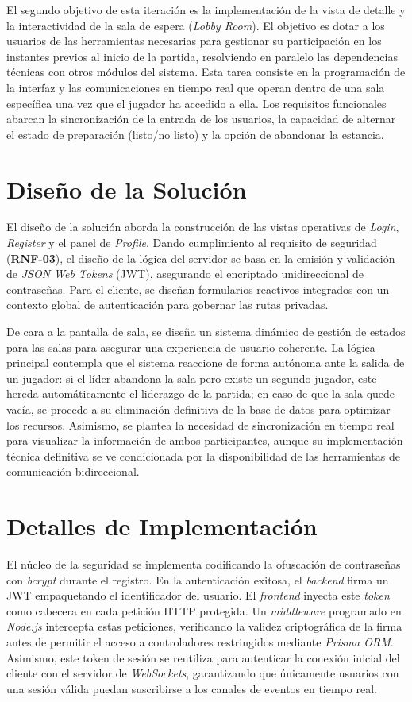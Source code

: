 El segundo objetivo de esta iteración es la implementación de la vista de detalle y la interactividad de la sala de espera (\textit{Lobby Room}). El objetivo es dotar a los usuarios de las herramientas necesarias para gestionar su participación en los instantes previos al inicio de la partida, resolviendo en paralelo las dependencias técnicas con otros módulos del sistema. Esta tarea consiste en la programación de la interfaz y las comunicaciones en tiempo real que operan dentro de una sala específica una vez que el jugador ha accedido a ella. Los requisitos funcionales abarcan la sincronización de la entrada de los usuarios, la capacidad de alternar el estado de preparación (listo/no listo) y la opción de abandonar la estancia.

\section{Diseño de la Solución}
El diseño de la solución aborda la construcción de las vistas operativas de \textit{Login}, \textit{Register} y el panel de \textit{Profile}. Dando cumplimiento al requisito de seguridad (\textbf{RNF-03}), el diseño de la lógica del servidor se basa en la emisión y validación de \textit{JSON Web Tokens} (JWT), asegurando el encriptado unidireccional de contraseñas. Para el cliente, se diseñan formularios reactivos integrados con un contexto global de autenticación para gobernar las rutas privadas.

De cara a la pantalla de sala, se diseña un sistema dinámico de gestión de estados para las salas para asegurar una experiencia de usuario coherente. La lógica principal contempla que el sistema reaccione de forma autónoma ante la salida de un jugador: si el líder abandona la sala pero existe un segundo jugador, este hereda automáticamente el liderazgo de la partida; en caso de que la sala quede vacía, se procede a su eliminación definitiva de la base de datos para optimizar los recursos. Asimismo, se plantea la necesidad de sincronización en tiempo real para visualizar la información de ambos participantes, aunque su implementación técnica definitiva se ve condicionada por la disponibilidad de las herramientas de comunicación bidireccional.

\section{Detalles de Implementación}
El núcleo de la seguridad se implementa codificando la ofuscación de contraseñas con \textit{bcrypt} durante el registro. En la autenticación exitosa, el \textit{backend} firma un JWT empaquetando el identificador del usuario. El \textit{frontend} inyecta este \textit{token} como cabecera en cada petición HTTP protegida. Un \textit{middleware} programado en \textit{Node.js} intercepta estas peticiones, verificando la validez criptográfica de la firma antes de permitir el acceso a controladores restringidos mediante \textit{Prisma ORM}. Asimismo, este token de sesión se reutiliza para autenticar la conexión inicial del cliente con el servidor de \textit{WebSockets}, garantizando que únicamente usuarios con una sesión válida puedan suscribirse a los canales de eventos en tiempo real.

